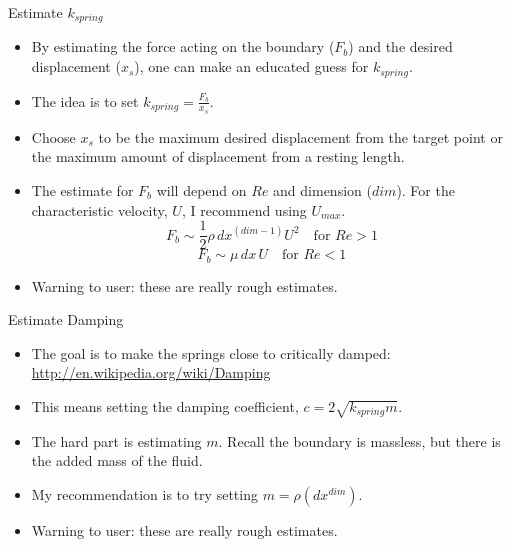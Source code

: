 \documentclass{beamer}
\begin{document}
\begin{frame}{Estimate \( k_{spring} \)}
\begin{itemize}
\item By estimating the force acting on the boundary (\( F_b \)) and the desired displacement (\( x_s \)), one can make an educated guess for \( k_{spring} \).

\item The idea is to set \( k_{spring} = \frac{F_b}{x_s} \).

\item Choose \( x_s \) to be the maximum desired displacement from the target point or the maximum amount of displacement from a resting length.

\item The estimate for \( F_b \) will depend on \( Re \) and dimension (\( dim \)). For the characteristic velocity, \( U \), I recommend using \( U_{max} \).
\[
F_b \sim \frac{1}{2} \rho \, dx^{(dim-1)} U^2 \quad \text{for } Re > 1
\]
\[
F_b \sim \mu \, dx \, U \quad \text{for } Re < 1
\]

\item Warning to user: these are really rough estimates.
\end{itemize}
\end{frame}

\begin{frame}{Estimate Damping}
\begin{itemize}
\item The goal is to make the springs close to critically damped: \url{http://en.wikipedia.org/wiki/Damping}

\item This means setting the damping coefficient, \( c = 2 \sqrt{k_{spring} m} \).

\item The hard part is estimating \( m \). Recall the boundary is massless, but there is the added mass of the fluid.

\item My recommendation is to try setting \( m = \rho (dx^{dim}) \).

\item Warning to user: these are really rough estimates.
\end{itemize}
\end{frame}
\end{document}
